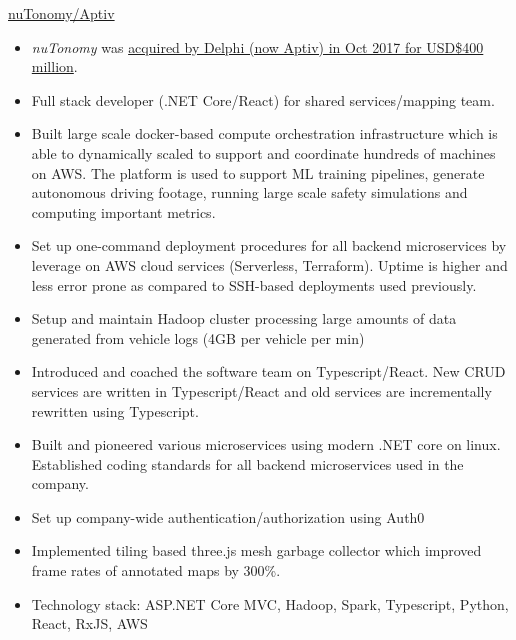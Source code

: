 \documentclass[]{cv} %
\begin{document}
\entry
{\href{https://www.aptiv.com/solutions/autonomous-mobility}{nuTonomy/Aptiv}}
{
\vspace{-\belowdisplayshortskip}
\begin{itemize}
\item \emph{nuTonomy} was \href{https://techcrunch.com/2017/10/24/delphi-buys-nutonomy-for-400-million-to-scale-and-deliver-autonomous-vehicles/}{acquired by Delphi (now Aptiv) in Oct 2017 for USD\$400 million}.
\item Full stack developer (.NET Core/React) for shared services/mapping team.
\item Built large scale docker-based compute orchestration infrastructure which is able to dynamically scaled to support and coordinate hundreds of machines on AWS. The platform is used to support ML training pipelines, generate autonomous driving footage, running large scale safety simulations and computing important metrics.
\item Set up one-command deployment procedures for all backend microservices by leverage on AWS cloud services (Serverless, Terraform). Uptime is higher and less error prone as compared to SSH-based deployments used previously.
\item Setup and maintain Hadoop cluster processing large amounts of data generated from vehicle logs (4GB per vehicle per min)
\item Introduced and coached the software team on Typescript/React. New CRUD services are written in Typescript/React and old services are incrementally rewritten using Typescript.
\item Built and pioneered various microservices using modern .NET core on linux. Established coding standards for all backend microservices used in the company.
\item Set up company-wide authentication/authorization using Auth0
\item Implemented tiling based three.js mesh garbage collector which improved frame rates of annotated maps by 300\%.
\item Technology stack: ASP.NET Core MVC, Hadoop, Spark, Typescript, Python, React, RxJS, AWS
\end{itemize}
}

\pagebreak
\end{document}
